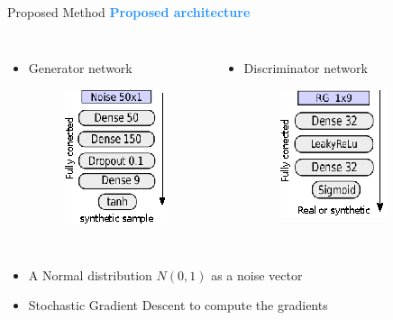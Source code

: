 \begin{frame}{Proposed Method}
    \Large\textcolor{dodgerblue}{\textbf{Proposed architecture}}
    \normalsize
    \vspace{2pt}
    \begin{columns}
    \begin{itemize}
        \item Generator network
        \vspace{5pt}
        \begin{figure}
            \centering
            \includegraphics[scale=2]{figures/generator_network.eps}
        \end{figure}
    \end{itemize}
    
    \begin{itemize}
        \item Discriminator network
        \vspace{5pt}
        \begin{figure}
            \centering
            \includegraphics[scale=2]{figures/discrimanotr_network.eps}
        \end{figure}
    \end{itemize}
    \end{columns}
    \vspace{12pt}
    \begin{itemize}
        \item A Normal distribution $N(0,1)$ as a noise vector
        \item Stochastic Gradient Descent to compute the gradients
    \end{itemize}
\end{frame}

